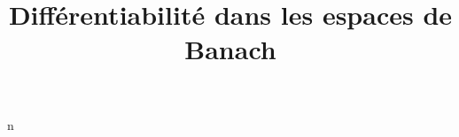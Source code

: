 \documentclass[a4paper, 11pt]{report}
\title{Différentiabilité dans les espaces de Banach}
\author{}
\begin{document}
\maketitle

\tableofcontents



n


\end{document}
